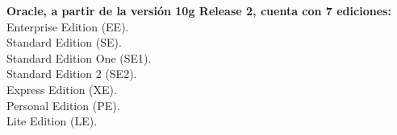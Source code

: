 \begin{enumerate}
\textbf {Oracle, a partir de la versión 10g Release 2, cuenta con 7 ediciones:}\\
Enterprise Edition (EE).\\
Standard Edition (SE).\\
Standard Edition One (SE1).\\
Standard Edition 2 (SE2).\\
Express Edition (XE).\\
Personal Edition (PE).\\
Lite Edition (LE).\\
\vspace{12pt}\\

\end{enumerate}